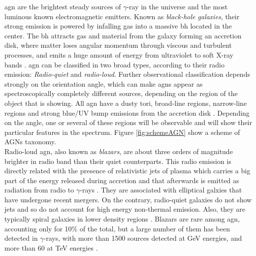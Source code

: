 \documentclass[main.tex]{subfiles}
\begin{document}
\gls{agn} are the brightest steady sources of $\gamma$-ray in the universe and the most luminous known electromagnetic emitters. Known as \textit{black-hole galaxies}, their strong emission is powered by infalling gas into a massive \gls{bh} located in the center. The \gls{bh} attracts gas and material from the galaxy forming an accretion disk, where matter loses angular momentum through viscous and turbulent processes, and emits a huge amount of energy from ultraviolet to soft X-ray bands \cite{1995AGN}. \gls{agn} can be classified in two broad types, according to their radio emission: \textit{Radio-quiet} and \textit{radio-loud}. Further observational classification depends strongly on the orientation angle, which can make \glspl{agn} appear as spectroscopically completely different sources, depending on the region of the object that is showing. All \gls{agn} have a dusty tori, broad-line regions, narrow-line regions and strong blue/UV bump emissions from the accretion disk \cite{2016AGNsingammarays}. Depending on the angle, one or several of these regions will be observable and will show their particular features in the spectrum. Figure \ref{fig:schemeAGN} show a scheme of AGNs taxonomy.\\
Radio-loud \gls{agn}, also known as \textit{blazars}, are about three orders of magnitude brighter in radio band than their quiet counterparts. This radio emission is directly related with the presence of relativistic jets of plasma which carries a big part of the energy released during accretion and that afterwards is emitted as radiation from radio to $\gamma$-rays \cite{2016AGNgammarayobss}. They are associated with elliptical galxies that have undergone recent mergers.
On the contrary, radio-quiet galaxies do not show jets and so do not account for high energy non-thermal emission. Also, they are typically spiral galaxies in lower density regions \cite{1995AGNradioloudradioquiet}.
Blazars are rare among \gls{agn}, accounting only for 10\% of the total, but a large number of them has been detected in $\gamma$-rays, with more than 1500 sources detected at GeV energies, and more than 60 at TeV energies \cite{2016AGNsingammarays}.
\end{document}
